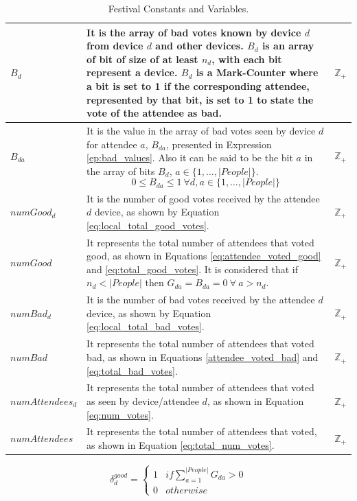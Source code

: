 \begin{table}[!ht]
\begin{tabular}{|p{2.4cm}|p{13.4cm}|r| }
		\hline
			$B_{d}$ & It is the array of bad votes known by device $d$ from device $d$ and other devices. $B_{d}$ is an array of bit of size of at least $n_{d}$, with each bit represent a device. $B_{d}$ is a Mark-Counter where a bit is set to 1 if the corresponding attendee, represented by that bit, is set to 1 to state the vote of the attendee as bad. & $\mathbb{Z}_{+}$ \\
		 \hline
		 	$B_{da}$ & It is the value in the array of bad votes seen by device $d$ for attendee $a$, $B_{da}$, presented in Expression \ref{ep:bad_values}. Also it can be said to be the bit $a$ in the array of bits $B_{d}$, $a \in \{1,\dots, |People|\}$.
				\begin{equation} \label{ep:bad_values}
					0 \le B_{da} \le 1 ~ \forall d, a \in \{1,\dots, |People|\}
				\end{equation} & 
			$\mathbb{Z}_{+}$ \\
		\hline
			$numGood_{d}$ & It is the number of good votes received by the attendee $d$ device, as shown by Equation \ref{eq:local_total_good_votes}. & $\mathbb{Z}_{+}$ \\
		\hline
			$numGood$ & It represents the total number of attendees that voted good, as shown in Equations  \ref{eq:attendee_voted_good} and \ref{eq:total_good_votes}. It is considered that if $n_{d} < |People|$ then $G_{da} = B_{da} = 0 ~ \forall ~ a > n_{d}$. & $\mathbb{Z}_{+}$ \\
		\hline
			$numBad_{d}$ & It is the number of bad votes received by the attendee $d$ device, as shown by Equation \ref{eq:local_total_bad_votes}. & $\mathbb{Z}_{+}$ \\
		\hline
			$numBad$ & It represents the total number of attendees that voted bad, as shown in Equations \ref{attendee_voted_bad} and \ref{eq:total_bad_votes}. & $\mathbb{Z}_{+}$ \\
		\hline
			$numAttendees_{d}$ & It represents the total number of attendees that voted as seen by device/attendee $d$, as shown in Equation \ref{eq:num_votes}. & $\mathbb{Z}_{+}$ \\
		\hline
			$numAttendees$ & It represents the total number of attendees that voted, as shown in Equation \ref{eq:total_num_votes}. & $\mathbb{Z}_{+}$ \\
		\hline
	\end{tabular}
			
	\caption{Festival Constants and Variables.}
	\label{tab:festival_constants_variables}
\end{table}
\begin{equation} \label{eq:attendee_voted_good}
	\delta^{good}_{d} = \left\{\begin{array}{ll}
		1 & if \sum^{|People|}_{a=1} G_{da} > 0\\
		0 & otherwise
	\end{array}
	\right.
\end{equation}
